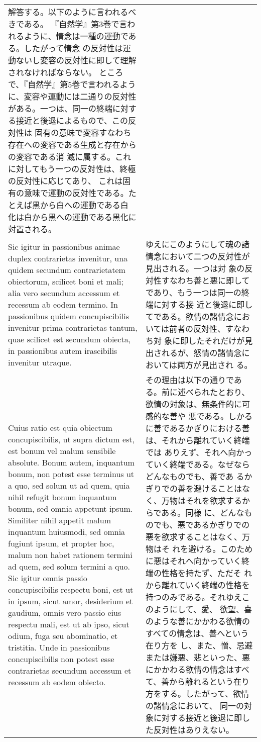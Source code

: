 \documentclass[10pt]{jsarticle} %
\begin{document}
\begin{longtable}{p{21em}p{21em}}
解答する。以下のように言われるべきである。
『自然学』第3巻で言われるように、情念は一種の運動である。したがって情念
 の反対性は運動ないし変容の反対性に即して理解されなければならない。
ところで、『自然学』第5巻で言われるように、変容や運動には二通りの反対性
 がある。一つは、同一の終端に対する接近と後退によるもので、この反対性は
 固有の意味で変容すなわち存在への変容である生成と存在からの変容である消
 滅に属する。これに対してもう一つの反対性は、終極の反対性に応じてあり、
 これは固有の意味で運動の反対性である。たとえば黒から白への運動である白
 化は白から黒への運動である黒化に対置される。


\\


Sic igitur in passionibus animae duplex
contrarietas invenitur, una quidem secundum contrarietatem obiectorum,
scilicet boni et mali; alia vero secundum accessum et recessum ab eodem
termino. In passionibus quidem concupiscibilis invenitur prima
contrarietas tantum, quae scilicet est secundum obiecta, in passionibus
autem irascibilis invenitur utraque. 

&

ゆえにこのようにして魂の諸情念において二つの反対性が見出される。一つは対
 象の反対性すなわち善と悪に即してであり、もう一つは同一の終端に対する接
 近と後退に即してである。欲情の諸情念においては前者の反対性、すなわち対
 象に即したそれだけが見出されるが、怒情の諸情念においては両方が見出され
 る。


\\

Cuius ratio est quia obiectum
concupiscibilis, ut supra dictum est, est bonum vel malum sensibile
absolute. 
Bonum autem, inquantum bonum, non potest esse terminus ut a
quo, sed solum ut ad quem, quia nihil refugit bonum inquantum bonum, sed
omnia appetunt ipsum. Similiter nihil appetit malum inquantum huiusmodi,
sed omnia fugiunt ipsum, et propter hoc, malum non habet rationem
termini ad quem, sed solum termini a quo. Sic igitur omnis passio
concupiscibilis respectu boni, est ut in ipsum, sicut amor, desiderium
et gaudium, omnis vero passio eius respectu mali, est ut ab ipso, sicut
odium, fuga seu abominatio, et tristitia. Unde in passionibus
concupiscibilis non potest esse contrarietas secundum accessum et
recessum ab eodem obiecto. 

&

その理由は以下の通りである。前に述べられたとおり、欲情の対象は、無条件的に可感的な善や
悪である。しかるに善であるかぎりにおける善は、それから離れていく終端では
 ありえず、それへ向かっていく終端である。なぜならどんなものでも、善であ
 るかぎりでの善を避けることはなく、万物はそれを欲求するからである。同様
 に、どんなものでも、悪であるかぎりでの悪を欲求することはなく、万物はそ
 れを避ける。このために悪はそれへ向かっていく終端の性格を持たず、ただそ
 れから離れていく終端の性格を持つのみである。それゆえこのようにして、愛、
 欲望、喜のような善にかかわる欲情のすべての情念は、善へという在り方を
 し、また、憎、忌避または嫌悪、悲といった、悪にかかわる欲情の情念はすべ
 て、善から離れるという在り方をする。したがって、欲情の諸情念において、
 同一の対象に対する接近と後退に即した反対性はありえない。



\end{longtable}
\end{document}
